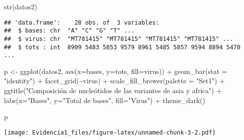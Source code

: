 \documentclass[
]{article}
\newenvironment{Shaded}{\begin{snugshade}}{\end{snugshade}}
\newcommand{\AttributeTok}[1]{\textcolor[rgb]{0.77,0.63,0.00}{#1}}
\newcommand{\FunctionTok}[1]{\textcolor[rgb]{0.00,0.00,0.00}{#1}}
\newcommand{\NormalTok}[1]{#1}
\newcommand{\OtherTok}[1]{\textcolor[rgb]{0.56,0.35,0.01}{#1}}
\newcommand{\SpecialCharTok}[1]{\textcolor[rgb]{0.00,0.00,0.00}{#1}}
\newcommand{\StringTok}[1]{\textcolor[rgb]{0.31,0.60,0.02}{#1}}
\begin{document}
\begin{Shaded}
\begin{Highlighting}[]
\FunctionTok{str}\NormalTok{(datos2)}
\end{Highlighting}
\end{Shaded}

\begin{verbatim}
## 'data.frame':    28 obs. of  3 variables:
##  $ bases: chr  "A" "C" "G" "T" ...
##  $ virus: chr  "MT781415" "MT781415" "MT781415" "MT781415" ...
##  $ tots : int  8909 5483 5853 9579 8961 5485 5857 9594 8894 5470 ...
\end{verbatim}

\begin{Shaded}
\begin{Highlighting}[]
\NormalTok{p }\OtherTok{\textless{}{-}} \FunctionTok{ggplot}\NormalTok{(datos2, }\FunctionTok{aes}\NormalTok{(}\AttributeTok{x=}\NormalTok{bases, }\AttributeTok{y=}\NormalTok{tots, }\AttributeTok{fill=}\NormalTok{virus)) }\SpecialCharTok{+} \FunctionTok{geom\_bar}\NormalTok{(}\AttributeTok{stat =} \StringTok{"identity"}\NormalTok{) }\SpecialCharTok{+} \FunctionTok{facet\_grid}\NormalTok{(}\SpecialCharTok{\textasciitilde{}}\NormalTok{virus) }\SpecialCharTok{+} \FunctionTok{scale\_fill\_brewer}\NormalTok{(}\AttributeTok{palette =} \StringTok{"Set1"}\NormalTok{) }\SpecialCharTok{+} \FunctionTok{ggtitle}\NormalTok{(}\StringTok{"Composición de nucleótidos de las variantes de asia y africa"}\NormalTok{) }\SpecialCharTok{+} \FunctionTok{labs}\NormalTok{(}\AttributeTok{x=}\StringTok{"Bases"}\NormalTok{, }\AttributeTok{y=}\StringTok{"Total de bases"}\NormalTok{, }\AttributeTok{fill=}\StringTok{"Virus"}\NormalTok{) }\SpecialCharTok{+} \FunctionTok{theme\_dark}\NormalTok{()}

\NormalTok{p}
\end{Highlighting}
\end{Shaded}

\texttt{[image: Evidencia1\_files/figure-latex/unnamed-chunk-3-2.pdf]}
\end{document}
